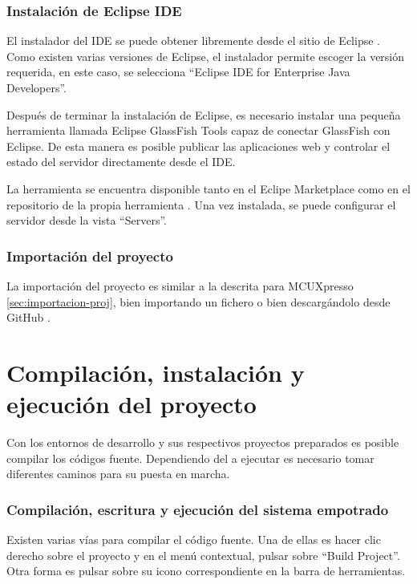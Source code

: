 \subsubsection{Instalación de Eclipse IDE} \label{sec:eclipse}
El instalador del IDE se puede obtener libremente desde el sitio de Eclipse
\cite{webpage:eclipse}. Como existen varias versiones de Eclipse, el instalador
permite escoger la versión requerida, en este caso, se selecciona ``Eclipse IDE
for Enterprise Java Developers''.


Después de terminar la instalación de Eclipse, es necesario instalar
una pequeña herramienta llamada Eclipse GlassFish Tools capaz de conectar
GlassFish con Eclipse. De esta manera es posible publicar las aplicaciones web y
controlar el estado del servidor directamente desde el IDE.

La herramienta se encuentra disponible tanto en el Eclipe Marketplace como
en el repositorio de la propia herramienta \cite{webpage:glassfish-tools}. Una
vez instalada, se puede configurar el servidor desde la vista ``Servers''.


\subsubsection{Importación del proyecto} \label{sec:importacion-proj-ee}
La importación del proyecto es similar a la descrita para MCUXpresso
\ref{sec:importacion-proj}, bien importando un fichero o bien descargándolo
desde GitHub \cite{webpage:repo-aw}.


\clearpage



\section{Compilación, instalación y ejecución del proyecto} \label{sec:exe}
Con los entornos de desarrollo y sus respectivos proyectos preparados es posible
compilar los códigos fuente. Dependiendo del  a ejecutar
es necesario tomar diferentes caminos para su puesta en marcha.


\subsubsection{Compilación, escritura y ejecución del sistema empotrado}
\label{sec:exe-se}
Existen varias vías para compilar el código fuente. Una de ellas es hacer clic
derecho sobre el proyecto y en el menú contextual, pulsar sobre ``Build
Project''. Otra forma es pulsar sobre su icono correspondiente en la barra de
herramientas.

